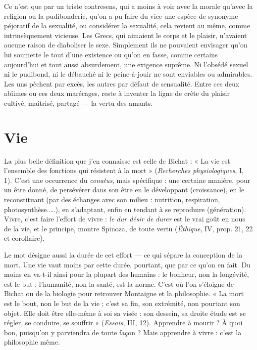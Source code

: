 Ce n’est que par un triste contresens, qui a moins à voir avec la morale
qu'avec la religion ou la pudibonderie, qu’on a pu faire du vice une espèce de
synonyme péjoratif de la sexualité, ou considérer la sexualité, cela revient au
même, comme intrinsèquement vicieuse. Les Grecs, qui aimaient le corps et
le plaisir, n’avaient aucune raison de diaboliser le sexe. Simplement ils ne
pouvaient envisager qu’on lui soumette le tout d’une existence ou qu’on en
fasse, comme certains aujourd’hui et tout aussi absurdement, une exigence
suprême. Ni l’obsédé sexuel ni le pudibond, ni le débauché ni le peine-à-jouir
ne sont enviables ou admirables. Les uns pèchent par excès, les autres par
défaut de sensualité. Entre ces deux abîimes ou ces deux marécages, reste à
inventer la ligne de crête du plaisir cultivé, maîtrisé, partagé — la vertu des
amants.

\section{Vie}
La plus belle définition que j'en connaisse est celle de Bichat : « La vie
est l’ensemble des fonctions qui résistent à la mort » ({\it Recherches physiologiques},
I, 1). C’est une occurrence du {\it conatus}, mais spécifique : une certaine
manière, pour un être donné, de persévérer dans son être en le développant
(croissance), en le reconstituant (par des échanges avec son milieu : nutrition,
respiration, photosynthèse.….), en s’adaptant, enfin en tendant à se reproduire
(génération). Vivre, c’est faire l’effort de vivre : {\it le dur désir de durer} est le vrai
goût en nous de la vie, et le principe, montre Spinoza, de toute vertu ({\it Éthique},
IV, prop. 21, 22 et corollaire).

Le mot désigne aussi la durée de cet effort — ce qui sépare la conception de
la mort. Une vie vaut moins par cette durée, pourtant, que par ce qu’on en fait.
Du moins en va-t-il ainsi pour la plupart des humains : le bonheur, non la longévité,
est le but ; l'humanité, non la santé, est la norme. C’est où l’on s'éloigne
de Bichat ou de la biologie pour retrouver Montaigne et la philosophie. « La
mort est le bout, non le but de la vie ; c’est sa fin, son extrémité, non pourtant
son objet. Elle doit être elle-même à soi sa visée : son dessein, sa droite étude
est se régler, se conduire, se souffrir » ({\it Essais}, III, 12). Apprendre à mourir ? À
quoi bon, puisqu'on y parviendra de toute façon ? Mais apprendre à vivre :
c’est la philosophie même.

